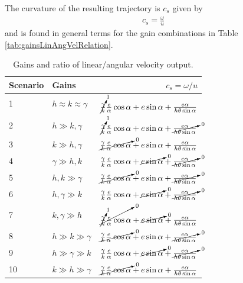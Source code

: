 \documentclass[12pt]{article}
\begin{document}
The curvature of the resulting trajectory is $c_s$ given by
\begin{align*}
c_s = \frac{\omega}{u}
\end{align*}
and is found in general terms for the gain combinations in Table \ref{tab:gainsLinAngVelRelation}.

\begin{table}[ht!]
\caption{Gains and ratio of linear/angular velocity output.}
\small
\centering
\begin{tabular}{@{}llr@{}} \toprule
Scenario & Gains                     & $c_s = \omega/u$                                                                                        \\ \midrule
1        & $h\approx k\approx\gamma$ & $\cancelto{1}{\tfrac{\gamma}{k}}\tfrac{e}{\alpha}\cos\alpha + e\sin\alpha + \tfrac{e\alpha}{h\theta\sin\alpha}$ \\
2        & $h\gg k,\gamma$           & $\cancelto{1}{\tfrac{\gamma}{k}}\tfrac{e}{\alpha}\cos\alpha + e\sin\alpha + \cancelto{0}{\tfrac{e\alpha}{h\theta\sin\alpha}}$ \\
3        & $k\gg h,\gamma$           & $\cancelto{0}{\tfrac{\gamma}{k}\tfrac{e}{\alpha}\cos\alpha} + e\sin\alpha + \tfrac{e\alpha}{h\theta\sin\alpha}$ \\
4        & $\gamma\gg h,k$           & $\tfrac{\gamma}{k}\tfrac{e}{\alpha}\cos\alpha + \cancelto{0}{e\sin\alpha} + \cancelto{0}{\tfrac{e\alpha}{h\theta\sin\alpha}}$ \\
5        & $h,k \gg\gamma$           & $\cancelto{0}{\tfrac{\gamma}{k}\tfrac{e}{\alpha}\cos\alpha} + e\sin\alpha + \cancelto{0}{\tfrac{e\alpha}{h\theta\sin\alpha}}$ \\
6        & $h,\gamma\gg k$           & $\tfrac{\gamma}{k}\tfrac{e}{\alpha}\cos\alpha + \cancelto{0}{e\sin\alpha} + \cancelto{0}{\tfrac{e\alpha}{h\theta\sin\alpha}}$ \\
7        & $k,\gamma\gg h$           & $\cancelto{0}{\cancelto{1}{\tfrac{\gamma}{k}}\tfrac{e}{\alpha}\cos\alpha} + \cancelto{0}{e\sin\alpha} + \tfrac{e\alpha}{h\theta\sin\alpha}$ \\
8        & $h\gg k\gg\gamma$         & $\cancelto{0}{\tfrac{\gamma}{k}\tfrac{e}{\alpha}\cos\alpha} + e\sin\alpha + \cancelto{0}{\tfrac{e\alpha}{h\theta\sin\alpha}}$ \\
9        & $h\gg\gamma\gg k$         & $\tfrac{\gamma}{k}\tfrac{e}{\alpha}\cos\alpha + \cancelto{0}{e\sin\alpha} + \cancelto{0}{\tfrac{e\alpha}{h\theta\sin\alpha}}$ \\
10       & $k\gg h\gg\gamma$         & $\cancelto{0}{\tfrac{\gamma}{k}\tfrac{e}{\alpha}\cos\alpha} + e\sin\alpha + \tfrac{e\alpha}{h\theta\sin\alpha}$ \\

\end{tabular}
\end{table}
\end{document}
